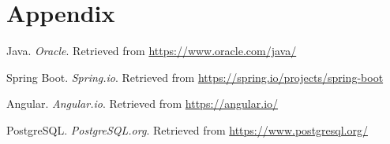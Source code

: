 \documentclass[openany, 11pt]{report} %
\begin{document}
\chapter{Appendix}

\begin{thebibliography}{9}

Java. \textit{Oracle}. Retrieved from \url{https://www.oracle.com/java/}

Spring Boot. \textit{Spring.io}. Retrieved from \url{https://spring.io/projects/spring-boot}

Angular. \textit{Angular.io}. Retrieved from \url{https://angular.io/}

PostgreSQL. \textit{PostgreSQL.org}. Retrieved from \url{https://www.postgresql.org/}

\end{thebibliography}
\end{document}
